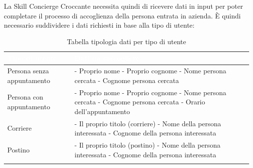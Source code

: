 La Skill Concierge Croccante necessita quindi di ricevere dati in input per poter completare il processo di accoglienza della persona entrata in azienda. È quindi necessario suddividere i dati richiesti in base alla tipo di utente:
\begin{center}
	\centering
	\renewcommand{\arraystretch}{1.5}
	\begin{longtable}{  p{4.5cm} p{8.3cm} }
		\rowcolor{tableHead}
		\textbf{\textcolor{white}{Tipo di utente}} & \textbf{\textcolor{white}{Dati da raccogliere}} \\
		\endhead  
		
		Persona senza \mbox{appuntamento} &  - Proprio nome \newline - Proprio cognome \newline - Nome persona cercata  \newline - Cognome persona cercata \\
		Persona con \mbox{appuntamento} &  - Proprio nome \newline - Proprio cognome \newline - Nome persona cercata  \newline - Cognome persona cercata \newline - Orario dell'appuntamento \\
		Corriere &  - Il proprio titolo (corriere) \newline - Nome della persona interessata \newline - Cognome della persona interessata \\
		Postino &  - Il proprio titolo (postino) \newline - Nome della persona interessata \newline - Cognome della persona interessata \\
		\rowcolor{white}
		\caption{Tabella tipologia dati per tipo di utente}
	\end{longtable}
\end{center}
